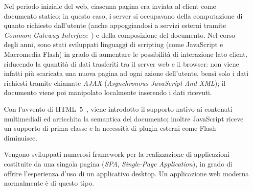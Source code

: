  Nel periodo iniziale del web, ciascuna pagina era inviata al client come documento statico;
  in questo caso, i server si occupavano della computazione di quanto richiesto dall'utente (anche appoggiandosi a servizi esterni tramite \emph{Common Gateway Interface}~\cite{Coar2004}) e della composizione del documento.
  Nel corso degli anni, sono stati sviluppati linguaggi di scripting (come JavaScript e Macromedia Flash) in grado di aumentare le possibilità di interazione lato client, riducendo la quantità di dati trasferiti tra il server web e il browser:
  non viene infatti più scaricata una nuova pagina ad ogni azione dell'utente, bensì solo i dati richiesti tramite chiamate \emph{AJAX} (\emph{Asynchronous JavaScript And XML});
  il documento viene poi manipolato localmente inserendo i dati ricevuti.

  Con l'avvento di HTML~5~\cite{Smith2008}, viene introdotto il supporto nativo ai contenuti multimediali ed arricchita la semantica del documento;
  inoltre JavaScript riceve un supporto di prima classe e la necessità di plugin esterni come Flash diminuisce.

  Vengono sviluppati numerosi framework per la realizzazione di applicazioni costituite da una singola pagina (\emph{SPA}, \emph{Single-Page Application}), in grado di offrire l'esperienza d'uso di un applicativo desktop.
  Un applicazione web moderna normalmente è di questo tipo.





